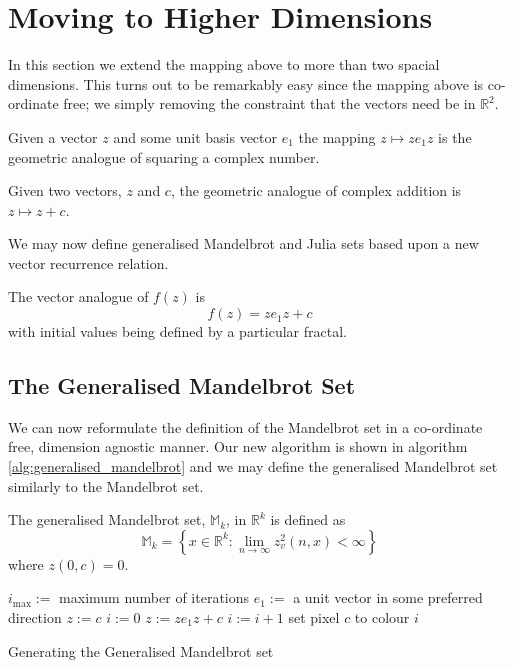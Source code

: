 \section{Moving to Higher Dimensions}

In this section we extend the mapping above to more than two spacial dimensions.
This turns out to be remarkably easy since the mapping above is co-ordinate free;
we simply removing the constraint that the vectors need be in $\mathbb{R}^2$.

\begin{definition}
Given a vector $z$ and some unit basis vector $e_1$ the mapping
$z \mapsto ze_1z$ is the geometric analogue of squaring a complex number.
\end{definition}

\begin{definition}
Given two vectors, $z$ and $c$, the geometric analogue of complex addition
is $z \mapsto z + c$.
\end{definition}

We may now define generalised Mandelbrot and Julia sets based upon
a new vector recurrence relation.

\begin{definition}\label{def:gen_f(z)}
The vector analogue of $f(z)$ is 
\[
f(z) = ze_1z + c
\]
with initial values being defined by a particular fractal.
\end{definition}

\subsection{The Generalised Mandelbrot Set}

We can now reformulate the definition of the Mandelbrot set in a co-ordinate
free, dimension agnostic manner. Our new algorithm is shown in algorithm
\ref{alg:generalised_mandelbrot} and we may define the generalised
Mandelbrot set similarly to the Mandelbrot set.

\begin{definition}
The generalised Mandelbrot set, $\mathbb{M}_k$, in $\mathbb{R}^k$ 
    is defined as
\[
\mathbb{M}_k = 
\left\{x \in \mathbb{R}^k 
: \lim_{n \rightarrow \infty} z_v^2(n,x) < \infty \right\} 
\]
where $z(0,c) = 0$.
\end{definition}

\begin{fancyalg}
\begin{algorithmic}[1]
\STATE $i_{\mathrm{max}} :=$ maximum number of iterations
\STATE $e_1 :=$ a unit vector in some preferred direction
\STATE $z := c$
\STATE $i := 0$
  \STATE $z := ze_1z + c$
  \STATE $i := i+1$
\ENDWHILE 
\STATE set pixel $c$ to colour $i$
\ENDFOR
\end{algorithmic}
\caption{
\label{alg:generalised_mandelbrot}
  Generating the Generalised Mandelbrot set}
\end{fancyalg}


